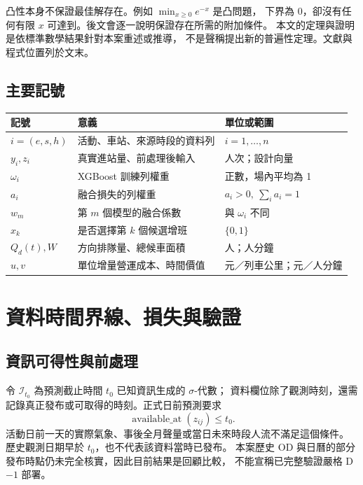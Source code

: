 凸性本身不保證最佳解存在。例如 $\min_{x\ge0}e^{-x}$ 是凸問題，
下界為 0，卻沒有任何有限 $x$ 可達到。後文會逐一說明保證存在所需的附加條件。
本文的定理與證明是依標準數學結果針對本案重述或推導，
不是聲稱提出新的普遍性定理。文獻與程式位置列於文末。

\subsection{主要記號}
\begin{table}[htbp]
\centering\small
\begin{tabularx}{\linewidth}{@{}p{23mm}X p{34mm}@{}}
\toprule
記號 & 意義 & 單位或範圍\\
\midrule
$i=(e,s,h)$ & 活動、車站、來源時段的資料列 & $i=1,\ldots,n$\\
$y_i,z_i$ & 真實進站量、前處理後輸入 & 人次；設計向量\\
$\omega_i$ & XGBoost 訓練列權重 & 正數，場內平均為 1\\
$a_i$ & 融合損失的列權重 & $a_i>0,\ \sum_i a_i=1$\\
$w_m$ & 第 $m$ 個模型的融合係數 & 與 $\omega_i$ 不同\\
$x_k$ & 是否選擇第 $k$ 個候選增班 & $\{0,1\}$\\
$Q_d(t),W$ & 方向排隊量、總候車面積 & 人；人分鐘\\
$u,v$ & 單位增量營運成本、時間價值 & 元／列車公里；元／人分鐘\\
\bottomrule
\end{tabularx}
\end{table}

\section{資料時間界線、損失與驗證}

\subsection{資訊可得性與前處理}
令 $\mathcal I_{t_0}$ 為預測截止時間 $t_0$ 已知資訊生成的 $\sigma$-代數；
資料欄位除了觀測時刻，還需記錄真正發布或可取得的時刻。正式日前預測要求
\begin{equation}
\operatorname{available\_at}(z_{ij})\le t_0.
\end{equation}
活動日前一天的實際氣象、事後全月聲量或當日未來時段人流不滿足這個條件。
歷史觀測日期早於 $t_0$，也不代表該資料當時已發布。
本案歷史 OD 與日曆的部分發布時點仍未完全核實，因此目前結果是回顧比較，
不能宣稱已完整驗證嚴格 D$-1$ 部署。

